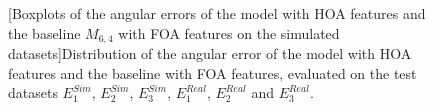 \begin{figure}[t]
    \centering
    
    [Boxplots of the angular errors of the model with HOA features and the baseline $M_{6,4}$ with FOA features on the simulated datasets]{Distribution of the angular error of the model with HOA features and the baseline with FOA features, evaluated on the test datasets $E^{Sim}_1$, $E^{Sim}_2$, $E^{Sim}_3$, $E^{Real}_1$, $E^{Real}_2$ and $E^{Real}_3$.}
    \label{fig:boxplots_multiLoca_hoa}
\end{figure}

